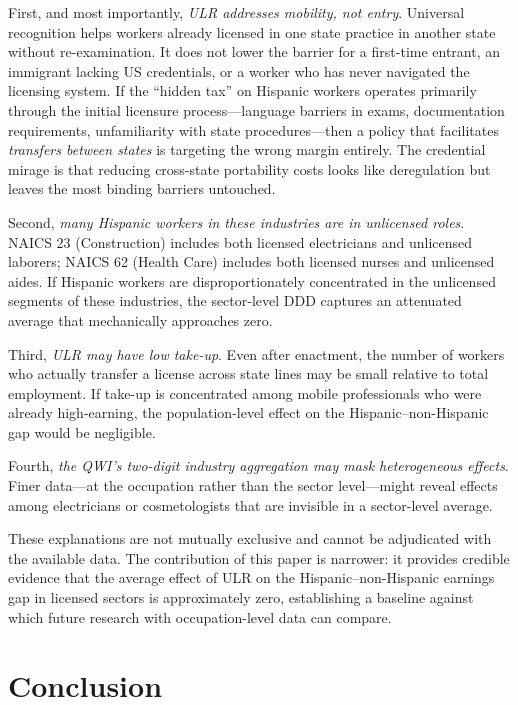\documentclass[12pt]{article}
\begin{document}
First, and most importantly, \textit{ULR addresses mobility, not entry}. Universal recognition helps workers already licensed in one state practice in another state without re-examination. It does not lower the barrier for a first-time entrant, an immigrant lacking US credentials, or a worker who has never navigated the licensing system. If the ``hidden tax'' on Hispanic workers operates primarily through the initial licensure process---language barriers in exams, documentation requirements, unfamiliarity with state procedures---then a policy that facilitates \textit{transfers between states} is targeting the wrong margin entirely. The credential mirage is that reducing cross-state portability costs looks like deregulation but leaves the most binding barriers untouched.

Second, \textit{many Hispanic workers in these industries are in unlicensed roles}. NAICS 23 (Construction) includes both licensed electricians and unlicensed laborers; NAICS 62 (Health Care) includes both licensed nurses and unlicensed aides. If Hispanic workers are disproportionately concentrated in the unlicensed segments of these industries, the sector-level DDD captures an attenuated average that mechanically approaches zero.

Third, \textit{ULR may have low take-up}. Even after enactment, the number of workers who actually transfer a license across state lines may be small relative to total employment. If take-up is concentrated among mobile professionals who were already high-earning, the population-level effect on the Hispanic--non-Hispanic gap would be negligible.

Fourth, \textit{the QWI's two-digit industry aggregation may mask heterogeneous effects}. Finer data---at the occupation rather than the sector level---might reveal effects among electricians or cosmetologists that are invisible in a sector-level average.

These explanations are not mutually exclusive and cannot be adjudicated with the available data. The contribution of this paper is narrower: it provides credible evidence that the average effect of ULR on the Hispanic--non-Hispanic earnings gap in licensed sectors is approximately zero, establishing a baseline against which future research with occupation-level data can compare.

\section{Conclusion}
\end{document}
